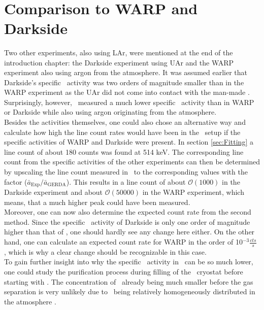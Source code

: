 \documentclass[encoding=utf8,british]{tumphthesis}
\begin{document}
\\
\section{Comparison to WARP and Darkside}

Two other experiments, also using LAr, were mentioned at the end of the introduction chapter: the Darkside experiment using UAr and the WARP experiment also using argon from the atmosphere.
It was assumed earlier that Darkside's specific \Kr\ activity was two orders of magnitude smaller than in the WARP experiment as the UAr did not come into contact with the man-made \Kr.
Surprisingly, however, \gerda\ measured a much lower specific \Kr\ activity than in WARP or Darkside while also using argon originating from the atmosphere.
\\

Besides the activities themselves, one could also chose an alternative way and calculate how high the line count rates would have been in the \gerda\ setup if the specific activities of WARP and Darkside were present.
In section \ref{sec:Fitting} a line count of about 180 counts was found at 514 keV.
The corresponding line count from the specific activities of the other experiments can then be determined by upscaling the line count measured in \gerda\ to the corresponding values with the factor ($\bar{a}_{\mathrm{Exp}}/\bar{a}_{\mathrm{GERDA}}$).
This results in a line count of about $\mathcal{O}(1000)$ in the Darkside experiment and about $\mathcal{O}(50000)$ in the WARP experiment, which means, that a much higher peak could have been measured.
\\

Moreover, one can now also determine the expected count rate from the second method.
Since the specific \Kr\ activity of Darkside is only one order of magnitude higher than that of \gerda, one should hardly see any change here either.
On the other hand, one can calculate an expected count rate for WARP in the order of 10$^{-3} \frac{\unit{cts}}{\unit{s}}$ , which is why a clear change should be recognizable in this case.
\\

To gain further insight into why the specific \Kr\ activity in \gerda\ can be so much lower, one could study the purification process during filling of the \gerda\ cryostat before starting with \PI.
The concentration of \Kr\ already being much smaller before the gas separation is very unlikely due to  \Kr\ being relatively homogeneously distributed in the atmosphere \cite{j._jacob_atmospheric_1987}.
\end{document}
